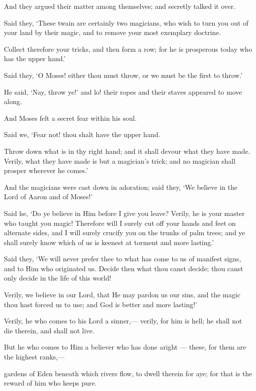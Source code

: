 \documentclass[fontsize=14pt, letterpaper, notitlepage, openany, DIV=12]{scrbook} %
\begin{document}
\noindent[20:62]
And they argued their matter among themselves; and secretly talked it over.

\noindent[20:63]
Said they, `These twain are certainly two magicians, who wish to turn you out of your
land by their magic, and to remove your most exemplary doctrine.

\noindent[20:64]
Collect therefore your tricks, and then form a row; for he is prosperous today who has the
upper hand.'

\noindent[20:65]
Said they, `O Moses! either thou must throw, or we must be the first to throw.'

\noindent[20:66]
He said, `Nay, throw ye!' and lo! their ropes and their staves appeared to move along.

\noindent[20:67]
And Moses felt a secret fear within his soul.

\noindent[20:68]
Said we, `Fear not! thou shalt have the upper hand.

\noindent[20:69]
Throw down what is in thy right hand; and it shall devour what they have made. Verily,
what they have made is but a magician's trick; and no magician shall prosper wherever he
comes.'

\noindent[20:70]
And the magicians were cast down in adoration; said they, `We believe in the Lord of
Aaron and of Moses!'

\noindent[20:71]
Said he, `Do ye believe in Him before I give you leave? Verily, he is your master who
taught you magic! Therefore will I surely cut off your hands and feet on alternate sides, and I
will surely crucify you on the trunks of palm trees; and ye shall surely know which of us is
keenest at torment and more lasting.'

\noindent[20:72]
Said they, `We will never prefer thee to what has come to us of manifest signs, and to
Him who originated us. Decide then what thou canst decide; thou canst only decide in the life of
this world!

\noindent[20:73]
Verily, we believe in our Lord, that He may pardon us our sins, and the magic thou hast
forced us to use; and God is better and more lasting!'

\noindent[20:74]
Verily, he who comes to his Lord a sinner,--- verily, for him is hell; he shall not die
therein, and shall not live.

\noindent[20:75]
But he who comes to Him a believer who has done aright --- these, for them are the
highest ranks,---

\noindent[20:76]
gardens of Eden beneath which rivers flow, to dwell therein for aye; for that is the reward
of him who keeps pure.
\end{document}
